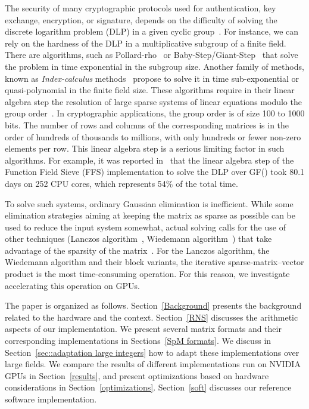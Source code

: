 \documentclass[runningheads,orivec]{llncs}
\begin{document}
The security of many cryptographic protocols used for authentication, key exchange, encryption, or signature, depends on the difficulty of solving the discrete logarithm problem (DLP) in a given cyclic group~\cite{ODLY84}. For instance, we can rely on the hardness of the DLP in a multiplicative subgroup of a finite field. There are algorithms, such as Pollard-rho~\cite{POLL75} or Baby-Step/Giant-Step~\cite{SHAN71} that solve the problem in time exponential in the subgroup size. Another family of methods, known as \textit{Index-calculus} methods~\cite{ADLE79} propose to solve it in time sub-exponential or quasi-polynomial in the finite field size. These algorithms require in their linear algebra step the resolution of large sparse systems of linear equations modulo the group order~\cite{LAMA90}. In cryptographic applications, the group order  is of size 100 to 1000 bits. The number of rows and columns of the corresponding matrices is in the order of hundreds of thousands to millions, with only hundreds or fewer non-zero elements per row. This linear algebra step is a serious limiting factor in such algorithms. For example, it was reported in~\cite{HAYA12} that the linear algebra step of the Function Field Sieve (FFS) implementation to solve the DLP over GF() took 80.1 days on 252 CPU cores, which represents 54\% of the total time.
 
To solve such systems, ordinary Gaussian elimination is inefficient. While some elimination strategies aiming at keeping the matrix as sparse as possible can be used to reduce the input system somewhat, actual solving calls for the use of other techniques (Lanczos algorithm~\cite{LANC52}, Wiedemann algorithm~\cite{WIED86}) that take advantage of the sparsity of the matrix~\cite{POME92}. For the Lanczos algorithm, the Wiedemann algorithm and their block variants, the iterative sparse-matrix--vector product is the most time-consuming operation. For this reason, we investigate accelerating this operation on GPUs.

The paper is organized as follows. Section~\ref{Background} presents the background related to the hardware and the context. Section~\ref{RNS} discusses the arithmetic aspects of our implementation. We present several matrix formats and their corresponding implementations in Sections~\ref{SpM formats}. We discuss in Section~\ref{sec::adaptation large integers} how to adapt these implementations over large fields. We compare the results of different implementations run on NVIDIA GPUs in Section~\ref{results}, and present optimizations based on hardware considerations in Section~\ref{optimizations}. Section~\ref{soft} discusses our reference software implementation.  
 
\end{document}
